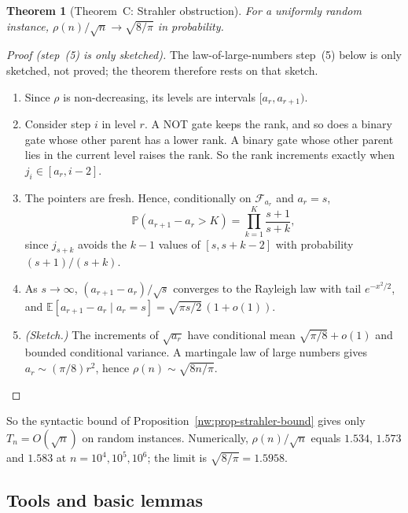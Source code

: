 \documentclass[11pt]{amsart}
\newtheorem{theorem}{Theorem}
\theoremstyle{definition}
\theoremstyle{remark}
\newcommand{\PP}{\mathbb{P}}
\newcommand{\EE}{\mathbb{E}}
\newcommand{\cF}{\mathcal{F}}
\begin{document}
\begin{theorem}[Theorem~C: Strahler obstruction]\label{nw:thm-C}
For a uniformly random instance, $\rho(n)/\sqrt n\to\sqrt{8/\pi}$ in
probability.
\end{theorem}

\begin{proof}[Proof (step~(5) is only sketched)]
The law-of-large-numbers step~(5) below is only sketched, not proved; the
theorem therefore rests on that sketch.
\begin{enumerate}[label=(\arabic*),leftmargin=*]
\item Since $\rho$ is non-decreasing, its levels are intervals
  $[a_r,a_{r+1})$.
\item Consider step $i$ in level $r$. A NOT gate keeps the rank, and so does
  a binary gate whose other parent has a lower rank. A binary gate whose other
  parent lies in the current level raises the rank. So the rank increments
  exactly when $j_i\in[a_r,i-2]$.
\item The pointers are fresh. Hence, conditionally on $\cF_{a_r}$ and
  $a_r=s$,
  \[
    \PP(a_{r+1}-a_r>K)=\prod_{k=1}^{K}\frac{s+1}{s+k},
  \]
  since $j_{s+k}$ avoids the $k-1$ values of $[s,s+k-2]$ with probability
  $(s+1)/(s+k)$.
\item As $s\to\infty$, $(a_{r+1}-a_r)/\sqrt s$ converges to the Rayleigh law
  with tail $e^{-x^2/2}$, and
  $\EE[a_{r+1}-a_r\mid a_r=s]=\sqrt{\pi s/2}\,(1+o(1))$.
\item \emph{(Sketch.)} The increments of $\sqrt{a_r}$ have conditional mean
  $\sqrt{\pi/8}+o(1)$ and bounded conditional variance. A martingale law of
  large numbers gives $a_r\sim(\pi/8)r^2$, hence $\rho(n)\sim\sqrt{8n/\pi}$.
  \qedhere
\end{enumerate}
\end{proof}

So the syntactic bound of Proposition~\ref{nw:prop-strahler-bound} gives only
$T_n=O(\sqrt n)$ on random instances. Numerically, $\rho(n)/\sqrt n$ equals
$1.534$, $1.573$ and $1.583$ at $n=10^4,10^5,10^6$; the limit is
$\sqrt{8/\pi}=1.5958$.

\subsection{Tools and basic lemmas}\label{nw:sec-tools}
\end{document}
